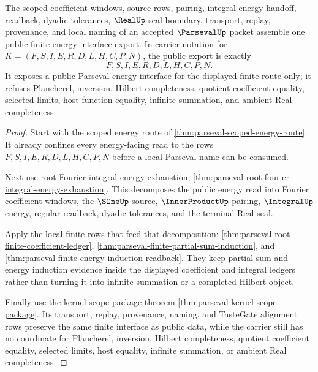 \begin{theorem}
\label{thm:parseval-public-energy-export}
The scoped coefficient windows, source rows, pairing, integral-energy handoff, readback, dyadic tolerances, $\RealUp$ seal boundary, transport, replay, provenance, and local naming of an accepted $\ParsevalUp$ packet assemble one public finite energy-interface export. In carrier notation for $K=(F,S,I,E,R,D,L,H,C,P,N)$, the public export is exactly
$$
F,S,I,E,R,D,L,H,C,P,N .
$$
It exposes a public Parseval energy interface for the displayed finite route only; it refuses Plancherel, inversion, Hilbert completeness, quotient coefficient equality, selected limits, host function equality, infinite summation, and ambient Real completeness.
\end{theorem}
\begin{proof}
Start with the scoped energy route of \autoref{thm:parseval-scoped-energy-route}. It already confines every energy-facing read to the rows $F,S,I,E,R,D,L,H,C,P,N$ before a local Parseval name can be consumed.

Next use root Fourier-integral energy exhaustion, \autoref{thm:parseval-root-fourier-integral-energy-exhaustion}. This decomposes the public energy read into Fourier coefficient windows, the $\SOneUp$ source, $\InnerProductUp$ pairing, $\IntegralUp$ energy, regular readback, dyadic tolerances, and the terminal Real seal.

Apply the local finite rows that feed that decomposition: \autoref{thm:parseval-root-finite-coefficient-ledger}, \autoref{thm:parseval-finite-partial-sum-induction}, and \autoref{thm:parseval-finite-energy-induction-readback}. They keep partial-sum and energy induction evidence inside the displayed coefficient and integral ledgers rather than turning it into infinite summation or a completed Hilbert object.

Finally use the kernel-scope package theorem \autoref{thm:parseval-kernel-scope-package}. Its transport, replay, provenance, naming, and TasteGate alignment rows preserve the same finite interface as public data, while the carrier still has no coordinate for Plancherel, inversion, Hilbert completeness, quotient coefficient equality, selected limits, host equality, infinite summation, or ambient Real completeness.
\end{proof}


